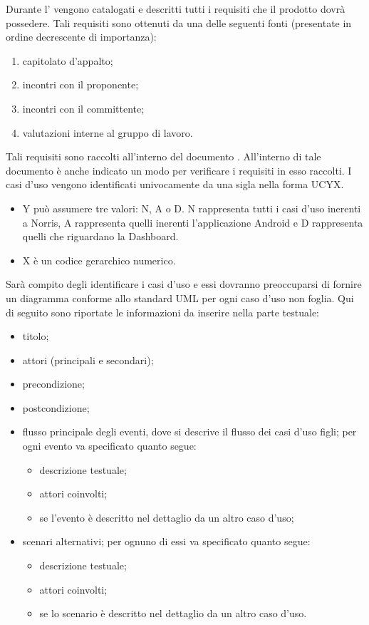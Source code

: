 			Durante l' vengono catalogati e descritti tutti i requisiti che il prodotto dovrà possedere. Tali requisiti sono ottenuti da una delle seguenti fonti (presentate in ordine decrescente di importanza):
			\begin{enumerate}
				\item capitolato d’appalto;
				\item incontri con il proponente;
				\item incontri con il committente;
				\item valutazioni interne al gruppo di lavoro.
			\end{enumerate}
			Tali requisiti sono raccolti all'interno del documento . All'interno di tale documento è anche indicato un modo per verificare i requisiti in esso raccolti.
					I casi d'uso vengono identificati univocamente da una sigla nella forma UCYX.
					\begin{itemize}
						\item Y può assumere tre valori: N, A o D. N rappresenta tutti i casi d'uso inerenti a Norris, A rappresenta quelli inerenti l'applicazione Android e D rappresenta quelli che riguardano la Dashboard.
						\item X è un codice gerarchico numerico.
					\end{itemize}
					Sarà compito degli  identificare i casi d'uso e essi dovranno preoccuparsi di fornire un diagramma conforme allo standard UML per ogni caso d'uso non foglia. Qui di seguito sono riportate le informazioni da inserire nella parte testuale:
					\begin{itemize}
						\item titolo;
						\item attori (principali e secondari);
						\item precondizione;
						\item postcondizione;
						\item flusso principale degli eventi, dove si descrive il flusso dei casi d'uso figli; per ogni evento va specificato quanto segue:
						\begin{itemize}
							\item descrizione testuale;
							\item attori coinvolti;
							\item se l’evento è descritto nel dettaglio da un altro caso d’uso;
						\end{itemize}
						\item scenari alternativi; per ognuno di essi va specificato quanto segue:
						\begin{itemize}
							\item descrizione testuale;
							\item attori coinvolti;
							\item se lo scenario è descritto nel dettaglio da un altro caso d’uso.
						\end{itemize}
					\end{itemize}
